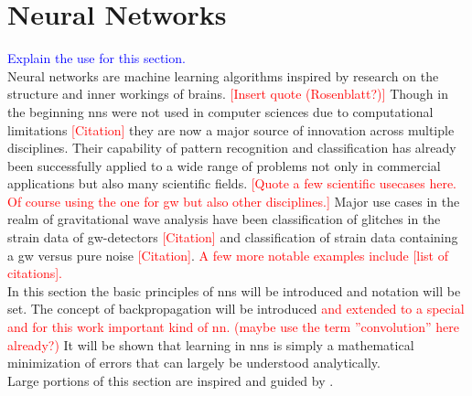 \section{Neural Networks}\label{sec:neural_networks}
\textcolor{blue}{Explain the use for this section.}\\
\noindent Neural networks are machine learning algorithms inspired by research on the structure and inner workings of brains. \textcolor{red}{[Insert quote (Rosenblatt?)]} Though in the beginning \gls{nns} were not used in computer sciences due to computational limitations \textcolor{red}{[Citation]} they are now a major source of innovation across multiple disciplines. Their capability of pattern recognition and classification has already been successfully applied to a wide range of problems not only in commercial applications but also many scientific fields. \textcolor{red}{[Quote a few scientific usecases here. Of course using the one for gw but also other disciplines.]} Major use cases in the realm of gravitational wave analysis have been classification of glitches in the strain data of \gls{gw}-detectors \textcolor{red}{[Citation]} and classification of strain data containing a \gls{gw} versus pure noise \textcolor{red}{[Citation]}. \textcolor{red}{A few more notable examples include [list of citations].}\\
In this section the basic principles of \gls{nns} will be introduced and notation will be set. The concept of backpropagation will be introduced \textcolor{red}{and extended to a special and for this work important kind of \gls{nn}. (maybe use the term ''convolution'' here already?)} It will be shown that learning in \gls{nns} is simply a mathematical minimization of errors that can largely be understood analytically.\medskip\\
Large portions of this section are inspired and guided by \cite{deep_learning_beginning, deep_learning_book}.

\begin{comment}
Neural networks have become a new and major player in data sciences over the past few years. They have proven to be very good at classification and interpolation. \textcolor{red}{[Insert ref]} Therefore and due to their computational efficiency they seem to be a compelling option even for scientific use cases and have been successfully applied to the classification and basic parameter estimation of \gls{gw}-data.\\
This sections aims to convey the basics of neural networks and the layers that are being utilized in this work. After having read this section it should be clear that neural networks are simply a mathematical model and that there is no magic involved. \textcolor{red}{(Maybe this is too prosa-like and/or should be put into the introduction)}
\end{comment}

